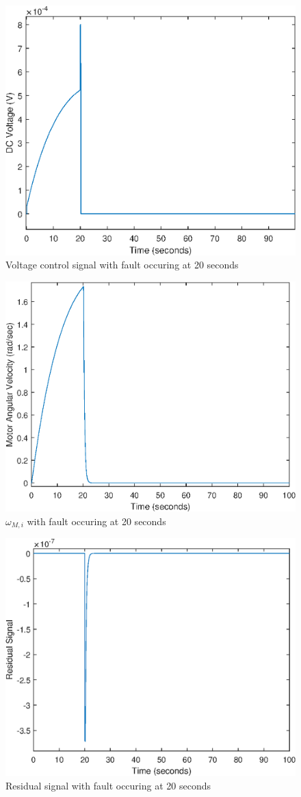 \begin{figure}
	\centering
	\includegraphics[width=120mm]{figures/voltage_reconfig}
	\caption{Voltage control signal with fault occuring at 20 seconds}
\end{figure} 


\begin{figure}
	\centering
	\includegraphics[width=120mm]{figures/omega_reconfig}
	\caption{$\omega_{M,i}$ with fault occuring at 20 seconds}
\end{figure} 


\begin{figure}
	\centering
	\includegraphics[width=120mm]{figures/residual_reconfig}
	\caption{Residual signal with fault occuring at 20 seconds}
\end{figure} 